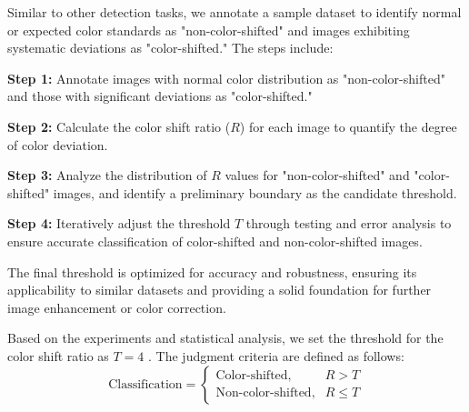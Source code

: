 \documentclass[withoutpreface,bwprint]{cumcmthesis}
\begin{document}
Similar to other detection tasks, we annotate a sample dataset to identify normal or expected color standards as "non-color-shifted" and images exhibiting systematic deviations as "color-shifted." The steps include:

\textbf{Step 1:} Annotate images with normal color distribution as "non-color-shifted" and those with significant deviations as "color-shifted."

\vspace{0.5em}
\textbf{Step 2:} Calculate the color shift ratio (\( R \)) for each image to quantify the degree of color deviation.

\vspace{0.5em}
\textbf{Step 3:} Analyze the distribution of \( R \) values for "non-color-shifted" and "color-shifted" images, and identify a preliminary boundary as the candidate threshold.

\vspace{0.5em}
\textbf{Step 4:} Iteratively adjust the threshold \( T \) through testing and error analysis to ensure accurate classification of color-shifted and non-color-shifted images.


The final threshold is optimized for accuracy and robustness, ensuring its applicability to similar datasets and providing a solid foundation for further image enhancement or color correction.

\begin{table}[htbp]
\centering
{}
\caption{}
\end{table}

Based on the experiments and statistical analysis, we set the threshold for the color shift ratio as $T = 4$ . The judgment criteria are defined as follows:
\[\text{Classification} =
\begin{cases} 
\text{Color-shifted}, & R > T \\
\text{Non-color-shifted}, & R \leq T
\end{cases}\]
\end{document}
